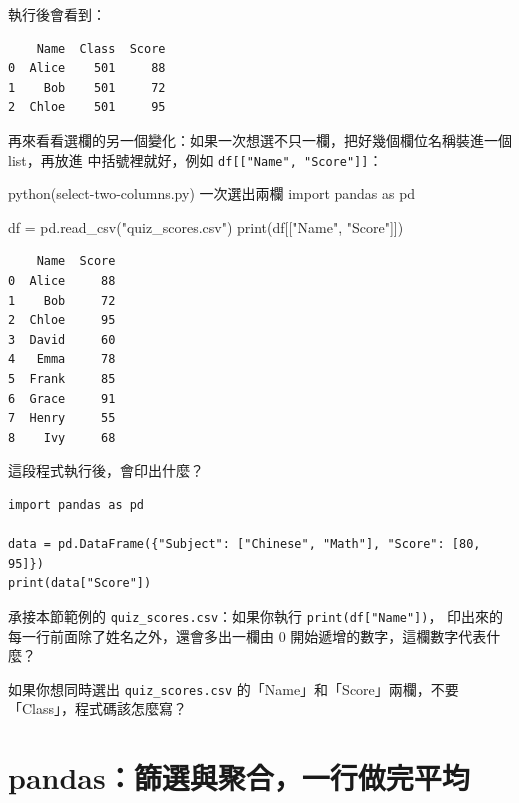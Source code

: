 執行後會看到：

\begin{verbatim}
    Name  Class  Score
0  Alice    501     88
1    Bob    501     72
2  Chloe    501     95
\end{verbatim}

再來看看選欄的另一個變化：如果一次想選不只一欄，把好幾個欄位名稱裝進一個 list，再放進
中括號裡就好，例如 \texttt{df[["Name", "Score"]]}：

\begin{example}{python}{(select-two-columns.py) 一次選出兩欄}
import pandas as pd

df = pd.read_csv("quiz_scores.csv")
print(df[["Name", "Score"]])
\end{example}

\begin{verbatim}
    Name  Score
0  Alice     88
1    Bob     72
2  Chloe     95
3  David     60
4   Emma     78
5  Frank     85
6  Grace     91
7  Henry     55
8    Ivy     68
\end{verbatim}


\begin{drills}[label=drills:pandas-read-select]
\item 這段程式執行後，會印出什麼？
\begin{verbatim}
import pandas as pd

data = pd.DataFrame({"Subject": ["Chinese", "Math"], "Score": [80, 95]})
print(data["Score"])
\end{verbatim}
\item 承接本節範例的 \texttt{quiz\_scores.csv}：如果你執行 \texttt{print(df["Name"])}，
印出來的每一行前面除了姓名之外，還會多出一欄由 0 開始遞增的數字，這欄數字代表什麼？
\item 如果你想同時選出 \texttt{quiz\_scores.csv} 的「Name」和「Score」兩欄，不要
「Class」，程式碼該怎麼寫？
\end{drills}

\section{pandas：篩選與聚合，一行做完平均}
\label{sec:pandas-filter-agg}

